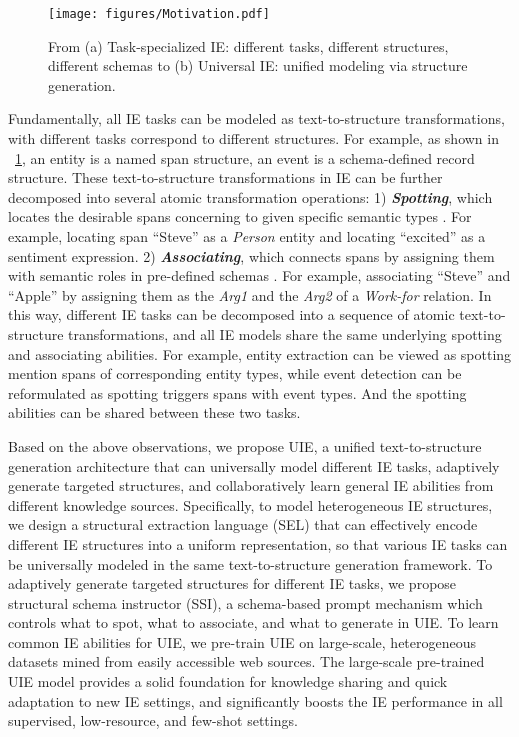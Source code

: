 \documentclass[11pt]{article}
\begin{document}
\begin{figure}[!tpb] 
  \centering
    \texttt{[image: figures/Motivation.pdf]}
    \caption{
        From (a) Task-specialized IE: different tasks, different structures, different schemas to (b) Universal IE: unified modeling via structure generation.
    }
    \label{fig:motivation}
\end{figure}

Fundamentally, all IE tasks can be modeled as text-to-structure transformations, with different tasks correspond to different structures.
For example, as shown in \figurename~\ref{fig:motivation}, an entity is a named span structure, an event is a schema-defined record structure.
These text-to-structure transformations in IE can be further decomposed into several atomic transformation operations:
1) \textit{\textbf{Spotting}}, which locates the desirable spans concerning to given specific semantic types \citep{kripke1971identity,DBLP:conf/cvpr/ChenY04}.
For example, locating span ``Steve'' as a \textit{Person} entity and locating ``excited'' as a sentiment expression.
2) \textit{\textbf{Associating}}, which connects spans by assigning them with semantic roles in pre-defined schemas \citep{onyshkevych-1994-issues,milward-thomas-2000-information}.
For example, associating ``Steve'' and ``Apple'' by assigning them as the  \textit{Arg1} and the \textit{Arg2} of a \textit{Work-for} relation.
In this way, different IE tasks can be decomposed into a sequence of atomic text-to-structure transformations, and all IE models share the same underlying spotting and associating abilities.
For example, entity extraction can be viewed as spotting mention spans of corresponding entity types, while event detection can be reformulated as spotting triggers spans with event types.
And the spotting abilities can be shared between these two tasks.

Based on the above observations, we propose UIE, a unified text-to-structure generation architecture that can universally model different IE tasks, adaptively generate targeted structures, and collaboratively learn general IE abilities from different knowledge sources.
Specifically, to model heterogeneous IE structures, we design a structural extraction language (SEL) that can effectively encode different IE structures into a uniform representation,  so that various IE tasks can be universally modeled in the same text-to-structure generation framework.
To adaptively generate targeted structures for different IE tasks, we propose structural schema instructor (SSI), a schema-based prompt mechanism which controls what to spot, what to associate, and what to generate in UIE.
To learn common IE abilities for UIE, we pre-train UIE on large-scale, heterogeneous datasets mined from easily accessible web sources.
The large-scale pre-trained UIE model provides a solid foundation for knowledge sharing and quick adaptation to new IE settings, and significantly boosts the IE performance in all supervised, low-resource, and few-shot settings.
\end{document}
